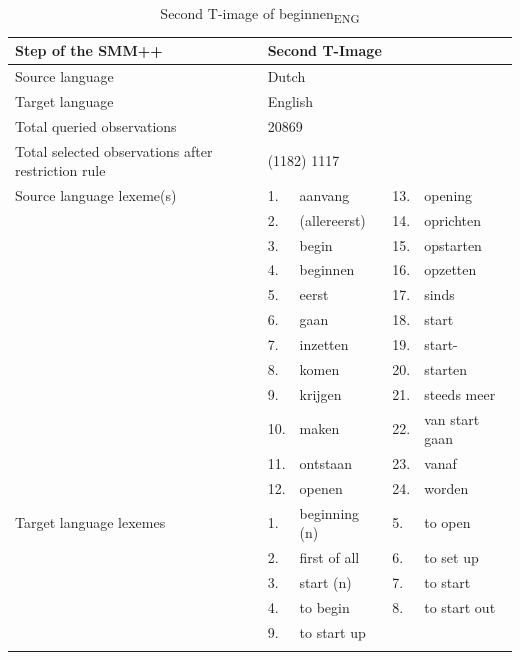 \begin{table}
\caption{Second T-image of beginnen\textsubscript{ENG}\label{tab:3:10}}
\small
\begin{tabularx}{\textwidth}{p{}lXlX}
\lsptoprule
Step of the SMM++ & \multicolumn{4}{l}{Second T-Image}\\ \midrule
\rowcolor{lsLightGray} Source language & \multicolumn{4}{l}{Dutch}\\
Target language & \multicolumn{4}{l}{English}\\
\rowcolor{lsLightGray} Total queried observations & \multicolumn{4}{l}{20869}\\
Total selected observations after restriction rule  & \multicolumn{4}{l}{(1182) 1117\footnotemark{}}\\
\rowcolor{lsLightGray}Source language lexeme(s)  & 1.& aanvang & 13.& opening\\
\rowcolor{lsLightGray}& 2.& (allereerst) & 14.& oprichten\\
\rowcolor{lsLightGray}& 3.& begin & 15.& opstarten\\
\rowcolor{lsLightGray}& 4.& beginnen & 16.& opzetten\\
\rowcolor{lsLightGray}& 5.& eerst & 17.& sinds\\
\rowcolor{lsLightGray}& 6.& gaan & 18.& start\\
\rowcolor{lsLightGray}& 7.& inzetten & 19.& start-\\
\rowcolor{lsLightGray}& 8.& komen & 20.& starten\\
\rowcolor{lsLightGray}& 9.& krijgen & 21.& steeds meer\\
\rowcolor{lsLightGray}& 10.& maken & 22.& van start gaan\\
\rowcolor{lsLightGray}& 11.& ontstaan & 23.& vanaf\\
\rowcolor{lsLightGray}& 12.& openen & 24.& worden\\
Target language lexemes & 1. & beginning (n) & 5. & to open \\
&2. & first of all & 6. & to set up \\
&3. & start (n) & 7. & to start \\
&4. &to begin & 8. & to start out \\
&9. & to start up && \\
\lspbottomrule
\end{tabularx}
\end{table}


